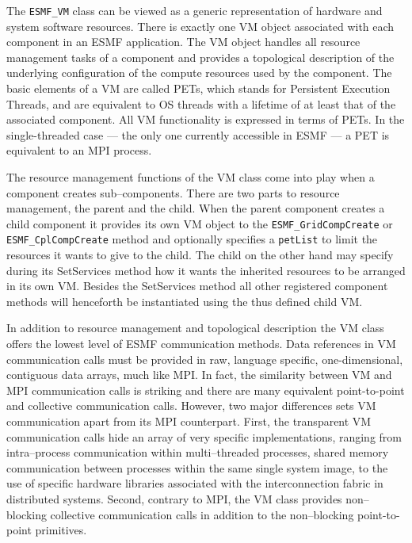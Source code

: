
The {\tt ESMF\_VM} class can be viewed as a generic representation of hardware and system software resources. There is exactly one VM object associated with each component in an ESMF application. The VM object handles all resource management tasks of a component and provides a topological description of the underlying configuration of the compute resources used by the component. The basic elements of a VM are called PETs, which stands for Persistent Execution Threads, and are equivalent to OS threads with a lifetime of at least that of the associated component. All VM functionality is expressed in terms of PETs. In the single-threaded case --- the only one currently accessible in ESMF --- a PET is equivalent to an MPI process. 

The resource management functions of the VM class come into play when a component creates sub--components. There are two parts to resource management, the parent and the child. When the parent component creates a child component it provides its own VM object to the {\tt ESMF\_GridCompCreate} or {\tt ESMF\_CplCompCreate} method and optionally specifies a {\tt petList} to limit the resources it wants to give to the child. The child on the other hand may specify during its SetServices method how it wants the inherited resources to be arranged in its own VM. Besides the SetServices method all other registered component methods will henceforth be instantiated using the thus defined child VM.

In addition to resource management and topological description the VM class offers the lowest level of ESMF communication methods. Data references in VM communication calls must be provided in raw, language specific, one-dimensional, contiguous data arrays, much like MPI. In fact, the similarity between VM and MPI communication calls is striking and there are many equivalent point-to-point and collective communication calls. However, two major differences sets VM communication apart from its MPI counterpart. First, the transparent VM communication calls hide an array of very specific implementations, ranging from intra--process communication within multi--threaded processes, shared memory communication between processes within the same single system image, to the use of specific hardware libraries associated with the interconnection fabric in distributed systems. Second, contrary to MPI, the VM class provides non--blocking collective communication calls in addition to the non--blocking point-to-point primitives.

